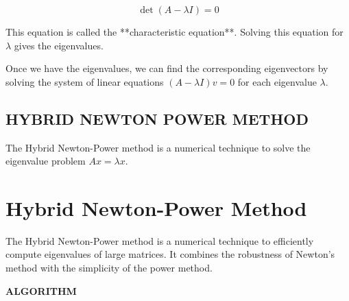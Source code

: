 \documentclass[journal,12pt,onecolumn]{IEEEtran}
\theoremstyle{remark}
\begin{document}
$$\det(A - \lambda I) = 0$$

This equation is called the **characteristic equation**. Solving this equation for $\lambda$ gives the eigenvalues.

Once we have the eigenvalues, we can find the corresponding eigenvectors by solving the system of linear equations $(A - \lambda I)v = 0$ for each eigenvalue $\lambda$.
\subsection{\textbf{HYBRID NEWTON POWER METHOD}}


The Hybrid Newton-Power method is a numerical technique to solve the eigenvalue problem $Ax = \lambda x$. 

\section{Hybrid Newton-Power Method}

The Hybrid Newton-Power method is a numerical technique to efficiently compute eigenvalues of large matrices. It combines the robustness of Newton's method with the simplicity of the power method.

\textbf{ALGORITHM}
\end{document}

